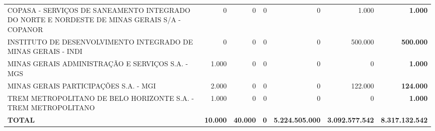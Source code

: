 \documentclass{article}
\begin{document}
\begin{longtable}[c]{m{3cm}|m{2cm}|m{2cm}|m{2cm}|m{2cm}|m{2cm}|m{2cm}}
\multicolumn{1}{L{4cm}|}{COPASA - SERVIÇOS DE SANEAMENTO INTEGRADO DO NORTE E NORDESTE DE MINAS GERAIS S/A - COPANOR} & \multicolumn{1}{r|}{     0} & \multicolumn{1}{r|}{     0} & \multicolumn{1}{r|}{0} & \multicolumn{1}{r|}{            0} & \multicolumn{1}{r|}{        1.000} & \multicolumn{1}{r}{ \textbf{        1.000}} \\
\multicolumn{1}{L{4cm}|}{INSTITUTO DE DESENVOLVIMENTO INTEGRADO DE MINAS GERAIS - INDI} & \multicolumn{1}{r|}{     0} & \multicolumn{1}{r|}{     0} & \multicolumn{1}{r|}{0} & \multicolumn{1}{r|}{            0} & \multicolumn{1}{r|}{      500.000} & \multicolumn{1}{r}{ \textbf{      500.000}} \\
\multicolumn{1}{L{4cm}|}{MINAS GERAIS ADMINISTRAÇÃO E SERVIÇOS S.A. - MGS} & \multicolumn{1}{r|}{ 1.000} & \multicolumn{1}{r|}{     0} & \multicolumn{1}{r|}{0} & \multicolumn{1}{r|}{            0} & \multicolumn{1}{r|}{            0} & \multicolumn{1}{r}{ \textbf{        1.000}} \\
\multicolumn{1}{L{4cm}|}{MINAS GERAIS PARTICIPAÇÕES S.A. - MGI} & \multicolumn{1}{r|}{ 2.000} & \multicolumn{1}{r|}{     0} & \multicolumn{1}{r|}{0} & \multicolumn{1}{r|}{            0} & \multicolumn{1}{r|}{      122.000} & \multicolumn{1}{r}{ \textbf{      124.000}} \\
\multicolumn{1}{L{4cm}|}{TREM METROPOLITANO DE BELO HORIZONTE S.A. - TREM METROPOLITANO} & \multicolumn{1}{r|}{ 1.000} & \multicolumn{1}{r|}{     0} & \multicolumn{1}{r|}{0} & \multicolumn{1}{r|}{            0} & \multicolumn{1}{r|}{            0} & \multicolumn{1}{r}{ \textbf{        1.000}} \\
\hline
\multicolumn{1}{L{4cm}|}{ \textbf{TOTAL}} & \multicolumn{1}{r|}{ \textbf{10.000}} & \multicolumn{1}{r|}{ \textbf{40.000}} & \multicolumn{1}{r|}{ \textbf{0}} & \multicolumn{1}{r|}{ \textbf{5.224.505.000}} & \multicolumn{1}{r|}{ \textbf{3.092.577.542}} & \multicolumn{1}{r}{ \textbf{8.317.132.542}} \\\end{longtable} 
\end{document}
